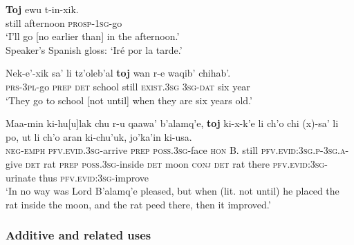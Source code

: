 \begin{exe}

	\ex\label{exAppendixKekchiTemporalLimitAfternoon}
	\gll \textbf{Toj} ewu t-in-xik.\\
	still afternoon \textsc{prosp}-1\textsc{sg}-go\\
	\glt \lq I'll go [no earlier than] in the afternoon.'\\
	Speaker's Spanish gloss: \lq Iré por la tarde.' \parencite[464]{Kockelman2020} 
	
	\ex\label{exAppendixKekchiSchool}
	\gll Nek-e'-xik sa' li tz'oleb'al \textbf{toj} wan r-e waqib' chihab'.\\
	\textsc{prs}-3\textsc{pl}-go \textsc{prep} \textsc{det} school still \textsc{exist}.3\textsc{sg} 3\textsc{sg}-\textsc{dat} six year\\
	\glt \lq They go to school [not until] when they are six years old.\rq{ }\parencite[466]{Kockelman2020}


	\ex \label{exAppendixKekchiRatPeed}
	\gll Maa-min ki-hu[u]lak chu r-u qaawa\rq{} b\rq{}alamq\rq{}e, \textbf{toj} ki-x-k\rq{}e li ch\rq{}o chi \textup{(}x\textup{)}-sa\rq{} li po, ut li ch\rq{}o aran ki-chu\rq{}uk, jo\rq{}ka\rq{}in ki-usa.\\
		\textsc{neg}-\textsc{emph} \textsc{pfv}.\textsc{evid}.3\textsc{sg}-arrive \textsc{prep} \textsc{poss}.3\textsc{sg}-face \textsc{hon} B. still \textsc{pfv}.\textsc{evid}:3\textsc{sg}.\textsc{p}-3\textsc{sg}.\textsc{a}-give \textsc{det} rat \textsc{prep} \textsc{poss}.3\textsc{sg}-inside \textsc{det} moon \textsc{conj} \textsc{det} rat there \textsc{pfv}.\textsc{evid}:3\textsc{sg}-urinate thus \textsc{pfv}.\textsc{evid}:3\textsc{sg}-improve\\
\glt \lq In no way was Lord B’alamq’e pleased, but when (lit. not until) he placed the rat inside the moon, and the rat peed there, then it improved.\rq{ }\parencite[236]{Kockelman2010}
\end{exe}



\subsubsection{Additive and related uses}

